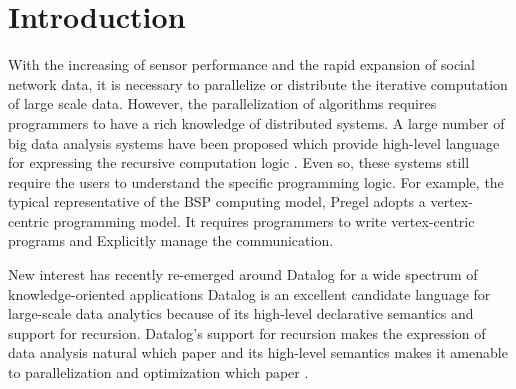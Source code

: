 \section{Introduction}
With the increasing of sensor performance and the rapid expansion of social network data, it is necessary to parallelize or distribute the iterative computation of large scale data. However, the parallelization of algorithms requires programmers to have a rich knowledge of distributed systems. A large number of big data analysis systems have been proposed which provide high-level language for expressing the recursive computation logic \cite{Dean:2004:MSD:1251254.1251264,giraph,maiter,Fan:2017:PSG:3035918.3035942,Malewicz2010Pregel,DBLP:journals/corr/GonzalezBJFHGS15,8017445,Low:2012:DGF:2212351.2212354,Han:2015:GUB:2777598.2777604,grace}. Even so, these systems still require the users to understand the specific programming logic. For example, the typical representative of the BSP computing model, Pregel \cite{Malewicz2010Pregel} adopts a vertex-centric programming model. It requires programmers to write vertex-centric programs and Explicitly manage the communication.

New interest has recently re-emerged around Datalog for a wide spectrum of knowledge-oriented applications \cite{Aref:2015:DIL:2723372.2742796,7840589,Shkapsky:2013:GQN:2536274.2536290,Alvaro:2010:DDT:2185923.2185942,Shkapsky:2016:BDA:2882903.2915229,Lam:2013:SDE:2510649.2511289,Seo:2013:DSD:2556549.2556572,Wang:2015:AFR:2824032.2824052}%
Datalog is an excellent candidate language for large-scale data analytics because of its high-level declarative semantics and support for recursion. Datalog's support for recursion makes the expression of data analysis natural \cite{}{\color{red}which paper}  and its high-level semantics makes it amenable to parallelization and optimization \cite{}{\color{red}which paper} .


